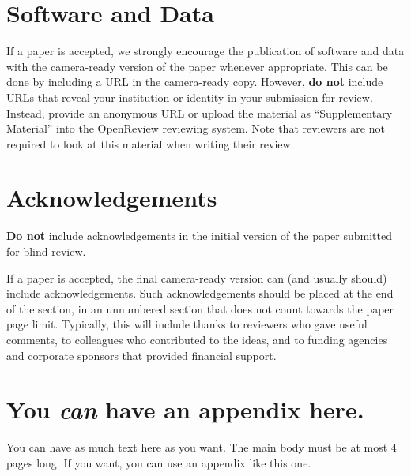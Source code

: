 \documentclass{article}
\theoremstyle{plain}
\theoremstyle{definition}
\theoremstyle{remark}
\begin{document}
\section*{Software and Data}

If a paper is accepted, we strongly encourage the publication of software and data with the
camera-ready version of the paper whenever appropriate. This can be
done by including a URL in the camera-ready copy. However, \textbf{do not}
include URLs that reveal your institution or identity in your
submission for review. Instead, provide an anonymous URL or upload
the material as ``Supplementary Material'' into the OpenReview reviewing
system. Note that reviewers are not required to look at this material
when writing their review.

\section*{Acknowledgements}

\textbf{Do not} include acknowledgements in the initial version of
the paper submitted for blind review.

If a paper is accepted, the final camera-ready version can (and
usually should) include acknowledgements.  Such acknowledgements
should be placed at the end of the section, in an unnumbered section
that does not count towards the paper page limit. Typically, this will 
include thanks to reviewers who gave useful comments, to colleagues 
who contributed to the ideas, and to funding agencies and corporate 
sponsors that provided financial support.

\nocite{langley00}






\section{You \emph{can} have an appendix here.}

You can have as much text here as you want. The main body must be at most $4$ pages long. If you want, you can use an appendix like this one.  

\end{document}

